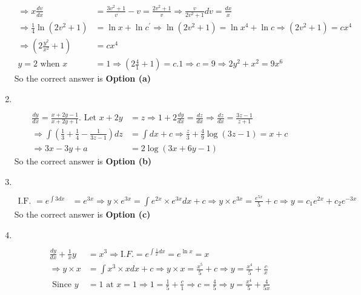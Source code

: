 \begin{enumerate}
\begin{answer}
\begin{align*}
	\Rightarrow x \frac{d v}{d x}&=\frac{3 v^{2}+1}{v}-v=\frac{2 v^{2}+1}{v} \Rightarrow \frac{v}{2 v^{2}+1} d v=\frac{d x}{x}\\
	\Rightarrow \frac{1}{4} \ln \left(2 v^{2}+1\right)&=\ln x+\ln c^{\prime} \Rightarrow \ln \left(2 v^{2}+1\right)=\ln x^{4}+\ln c \Rightarrow\left(2 v^{2}+1\right)=c x^{4}\\
	\Rightarrow\left(2 \frac{y^{2}}{x^{2}}+1\right)&=c x^{4}\\
	y=2\text{ when }x&=1 \Rightarrow\left(2 \frac{4}{1}+1\right)=c .1 \Rightarrow c=9 \Rightarrow 2 y^{2}+x^{2}=9 x^{6}
	\end{align*}
		So the correct answer is \textbf{Option (a)}
\end{answer}
	\item $\left. \right. $
\begin{answer}
	\begin{align*}
	\frac{d y}{d x}=\frac{x+2 y-1}{x+2 y+1}\text{. Let }x+2 y&=z \Rightarrow 1+2 \frac{d y}{d x}=\frac{d z}{d x} \Rightarrow \frac{d z}{d x}=\frac{3 z-1}{z+1}\\
	\Rightarrow \int\left(\frac{1}{3}+\frac{1}{4}-\frac{1}{3 z-1}\right) d z&=\int d x+c \Rightarrow \frac{z}{3}+\frac{4}{9} \log (3 z-1)=x+c\\
	\Rightarrow 3 x-3 y+a&=2 \log (3 x+6 y-1)
	\end{align*}
		So the correct answer is \textbf{Option (b)}
\end{answer}
	\item $\left. \right. $
\begin{answer}
	\begin{align*}
	\text{I.F. }=e^{\int 3 d x}&=e^{3 x} \Rightarrow y \times e^{3 x}=\int e^{2 x} \times e^{3 x} d x+c \Rightarrow y \times e^{3 x}=\frac{e^{5 x}}{5}+c \Rightarrow y=c_{1} e^{2 x}+c_{2} e^{-3 x}
	\end{align*}
		So the correct answer is \textbf{Option (c)}
\end{answer}
\item $\left. \right. $
\begin{answer}
	\begin{align*}
	\frac{d y}{d x}+\frac{1}{x} y&=x^{3} \Rightarrow \mathrm{I} . F .=e^{\int \frac{1}{x} d x}=e^{\ln x}=x\\
	\Rightarrow y \times x&=\int x^{3} \times x d x+c \Rightarrow y \times x=\frac{x^{5}}{5}+c \Rightarrow y=\frac{x^{4}}{5}+\frac{c}{x}\\
\text{	Since }y&=1\text{ at }x=1 \Rightarrow 1=\frac{1}{5}+\frac{c}{1} \Rightarrow c=\frac{4}{5} \Rightarrow y=\frac{x^{4}}{5}+\frac{4}{5 x}

\end{align*}
\end{answer}
\end{enumerate}
